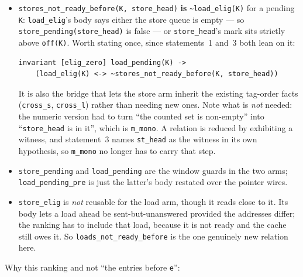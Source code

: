 \documentclass[11pt]{article}
\begin{document}
\begin{itemize}
\item \texttt{stores_not_ready_before(K, store_head)} \textbf{is}
  \texttt{\textasciitilde{}load_elig(K)} for a
  pending \texttt{K}: \texttt{load_elig}'s body says either the store
  queue is empty --- so \texttt{store_pending(store_head)} is false ---
  or \texttt{store_head}'s mark sits strictly above \texttt{off(K)}.
  Worth stating once, since statements~1 and~3 both lean on it:

  {\small
  \begin{verbatim}
invariant [elig_zero] load_pending(K) ->
    (load_elig(K) <-> ~stores_not_ready_before(K, store_head))
\end{verbatim}
  }

  It is also the bridge that lets the store arm inherit the existing
  tag-order facts (\texttt{cross_s}, \texttt{cross_l}) rather than
  needing new ones. Note what is \emph{not} needed: the numeric
  version had to turn ``the counted set is non-empty'' into
  ``\texttt{store_head} is in it'', which is \texttt{m_mono}. A
  relation is reduced by exhibiting a
  witness, and statement~3 names \texttt{st_head} as the witness in its
  own hypothesis, so \texttt{m_mono} no longer has to carry that step.
\item \texttt{store_pending} and \texttt{load_pending} are the window
  guards in the two arms; \texttt{load_pending_pre} is just the
  latter's body restated over the pointer wires.
\item \texttt{store_elig} is \emph{not} reusable for the
  load arm, though it reads close to it. Its body lets a load ahead be
  sent-but-unanswered provided the addresses differ; the ranking has to
  include that load, because it is not ready and the cache still owes
  it. So \texttt{loads_not_ready_before} is the one genuinely new
  relation here.
\end{itemize}

Why this ranking and not ``the entries before \texttt{e}'':
\end{document}
